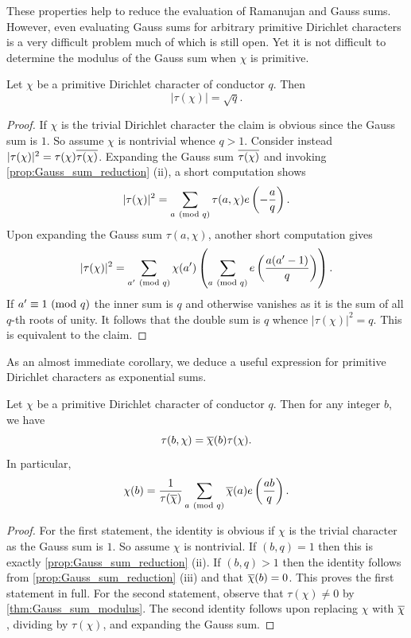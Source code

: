     These properties help to reduce the evaluation of Ramanujan and Gauss sums. However, even evaluating Gauss sums for arbitrary primitive Dirichlet characters is a very difficult problem much of which is still open. Yet it is not difficult to determine the modulus of the Gauss sum when \(\chi\) is primitive.

    \begin{theorem}\label{thm:Gauss_sum_modulus}
      Let \(\chi\) be a primitive Dirichlet character of conductor \(q\). Then
      \[
        |\tau(\chi)| = \sqrt{q}.
      \]
    \end{theorem}
    \begin{proof}
      If \(\chi\) is the trivial Dirichlet character the claim is obvious since the Gauss sum is \(1\). So assume \(\chi\) is nontrivial whence \(q > 1\). Consider instead \(|\tau(\chi)|^{2} = \tau(\chi)\overline{\tau(\chi)}\). Expanding the Gauss sum \(\overline{\tau(\chi)}\) and invoking \cref{prop:Gauss_sum_reduction} (ii), a short computation shows
      \[
        |\tau(\chi)|^{2} = \sum_{a \ (\mathrm{mod}\text{ }q)}\tau(a,\chi)e\left(-\frac{a}{q}\right).
      \]
      Upon expanding the Gauss sum \(\tau(a,\chi)\), another short computation gives
      \[
        |\tau(\chi)|^{2} = \sum_{a' \ (\mathrm{mod}\text{ }q)}\chi(a')\left(\sum_{a \ (\mathrm{mod}\text{ }q)}e\left(\frac{a(a'-1)}{q}\right)\right).
      \]
      If \(a' \equiv 1 \ (\mathrm{mod}\text{ }q)\) the inner sum is \(q\) and otherwise vanishes as it is the sum of all \(q\)-th roots of unity. It follows that the double sum is \(q\) whence \(|\tau(\chi)|^{2} = q\). This is equivalent to the claim.
    \end{proof}

    As an almost immediate corollary, we deduce a useful expression for primitive Dirichlet characters as exponential sums.

    \begin{corollary}\label{cor:gauss_sum_primitive_formula}
      Let \(\chi\) be a primitive Dirichlet character of conductor \(q\). Then for any integer \(b\), we have
      \[
        \tau(b,\chi) = \overline{\chi}(b)\tau(\chi).
      \]
      In particular,
      \[
        \chi(b) = \frac{1}{\tau(\overline{\chi})}\sum_{a \ (\mathrm{mod}\text{ }q)}\overline{\chi}(a)e\left(\frac{ab}{q}\right).
      \]
    \end{corollary}
    \begin{proof}
      For the first statement, the identity is obvious if \(\chi\) is the trivial character as the Gauss sum is \(1\). So assume \(\chi\) is nontrivial. If \((b,q) = 1\) then this is exactly \cref{prop:Gauss_sum_reduction} (ii). If \((b,q) > 1\) then the identity follows from \cref{prop:Gauss_sum_reduction} (iii) and that \(\overline{\chi}(b) = 0\). This proves the first statement in full. For the second statement, observe that \(\tau(\chi) \neq 0\) by \cref{thm:Gauss_sum_modulus}. The second identity follows upon replacing \(\chi\) with \(\overline{\chi}\), dividing by \(\tau(\chi)\), and expanding the Gauss sum.
    \end{proof}

